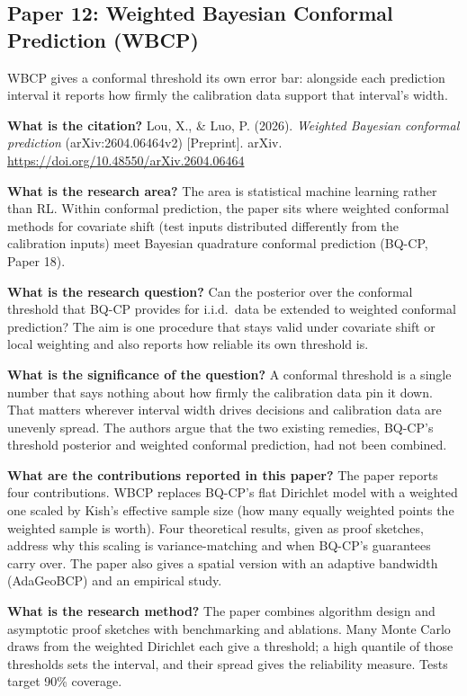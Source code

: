 \documentclass[11pt]{article}
\newcommand{\paper}[1]{\subsection*{#1}}
\newcommand{\q}[2]{\item \textbf{#1} #2}
\begin{document}
\paper{Paper 12: Weighted Bayesian Conformal Prediction (WBCP)}
WBCP gives a conformal threshold its own error bar: alongside each prediction interval it reports how firmly the calibration data support that interval's width.
\begin{qna}

\q{What is the citation?}
Lou, X., \& Luo, P. (2026). \emph{Weighted Bayesian conformal prediction} (arXiv:2604.06464v2) [Preprint]. arXiv. \url{https://doi.org/10.48550/arXiv.2604.06464}

\q{What is the research area?}
The area is statistical machine learning rather than RL. Within conformal prediction, the paper sits where weighted conformal methods for covariate shift (test inputs distributed differently from the calibration inputs) meet Bayesian quadrature conformal prediction (BQ-CP, Paper 18).

\q{What is the research question?}
Can the posterior over the conformal threshold that BQ-CP provides for i.i.d.\ data be extended to weighted conformal prediction? The aim is one procedure that stays valid under covariate shift or local weighting and also reports how reliable its own threshold is.

\q{What is the significance of the question?}
A conformal threshold is a single number that says nothing about how firmly the calibration data pin it down. That matters wherever interval width drives decisions and calibration data are unevenly spread. The authors argue that the two existing remedies, BQ-CP's threshold posterior and weighted conformal prediction, had not been combined.

\q{What are the contributions reported in this paper?}
The paper reports four contributions. WBCP replaces BQ-CP's flat Dirichlet model with a weighted one scaled by Kish's effective sample size (how many equally weighted points the weighted sample is worth). Four theoretical results, given as proof sketches, address why this scaling is variance-matching and when BQ-CP's guarantees carry over. The paper also gives a spatial version with an adaptive bandwidth (AdaGeoBCP) and an empirical study.

\q{What is the research method?}
The paper combines algorithm design and asymptotic proof sketches with benchmarking and ablations. Many Monte Carlo draws from the weighted Dirichlet each give a threshold; a high quantile of those thresholds sets the interval, and their spread gives the reliability measure. Tests target 90\% coverage.


\end{qna}
\end{document}
